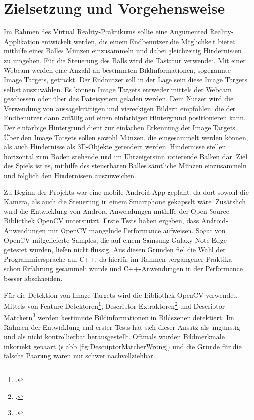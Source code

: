 
\section{Zielsetzung und Vorgehensweise}\label{zielvorgehen}
Im Rahmen des Virtual Reality-Praktikums sollte eine Augumented Reality-Applikation entwickelt werden, die einem Endbenutzer die Möglichkeit bietet mithilfe eines Balles Münzen einzusammeln und dabei gleichzeitig Hindernissen zu umgehen. Für die Steuerung des Balls wird die Tastatur verwendet. Mit einer Webcam werden eine Anzahl an bestimmten Bildinformationen, sogenannte Image Targets, getrackt. Der Endnutzer soll in der Lage sein diese Image Targets selbst auszuwählen. Es können Image Targets entweder mittels der Webcam geschossen oder über das Dateisystem geladen werden. Dem Nutzer wird die Verwendung von aussagekräftigen und viereckigen Bildern empfohlen, die der Endbenutzer dann zufällig auf einen einfarbigen Hintergrund positionieren kann. Der einfarbige Hintergrund dient zur einfachen Erkennung der Image Targets. Über den Image Targets sollen sowohl Münzen, die eingesammelt werden können, als auch Hindernisse als 3D-Objekte gerendert werden. Hindernisse stellen horizontal zum Boden stehende und im Uhrzeigersinn rotierende Balken dar. Ziel des Spiels ist es, mithilfe des steuerbaren Balles sämtliche Münzen einzusammeln und folglich den Hindernissen auszuweichen.

Zu Beginn der Projekts war eine mobile Android-App geplant, da dort sowohl die Kamera, als auch die Steuerung in einem Smartphone gekapselt wäre. Zusätzlich wird die Entwicklung von Android-Anwendungen mithilfe der Open Source-Bibliothek OpenCV unterstützt. Erste Tests haben ergeben, dass Android-Anwendungen mit OpenCV mangelnde Performance aufweisen. Sogar von OpenCV mitgelieferte Samples, die auf einem Samsung Galaxy Note Edge getestet wurden, liefen nicht flüssig. Aus diesen Gründen fiel die Wahl der Programmiersprache auf C++, da hierfür im Rahmen vergangener Praktika schon Erfahrung gesammelt wurde und C++-Anwendungen in der Performance besser abschneiden.

Für die Detektion von Image Targets wird die Bibliothek OpenCV verwendet. Mittels von Feature-Detektoren\footcite{opencvFeatureDetector}, Descriptor-Extraktoren\footcite{opencvDescriptorExtractor} und Descriptor-Matchern\footcite{opencvdescriptorMatcher} werden bestimmte Bildinformationen in Bildszenen detektiert. Im Rahmen der Entwicklung und erster Tests hat sich dieser Ansatz als ungünstig und als nicht kontrollierbar herausgestellt. Oftmals wurden Bildmerkmale inkorrekt gepaart (\acs{s} \acs{abb} \ref{fig:DescriptorMatcherWrong}) und die Gründe für die falsche Paarung waren nur schwer nachvollziehbar.

